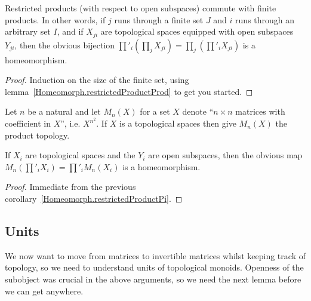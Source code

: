 \begin{corollary}
  \label{Homeomorph.restrictedProductPi}
  \leanok
  Restricted products (with respect to open subspaces) commute with finite products.
  In other words, if $j$ runs through a finite set $J$ and $i$ runs through an arbitrary
  set $I$, and if $X_{ji}$ are topological spaces equipped with open subspaces $Y_{ji}$,
  then the obvious bijection $\prod'_i(\prod_j X_{ji})=\prod_j\left(\prod'_i X_{ji}\right)$
  is a homeomorphism.
\end{corollary}
\begin{proof}
  \leanok
  Induction on the size of the finite set, using lemma~\ref{Homeomorph.restrictedProductProd}
  to get you started.
\end{proof}

 Let $n$ be a natural and let $M_n(X)$ for a set $X$ denote ``$n\times n$
  matrices with coefficient in $X$'', i.e. $X^{n^2}$. If $X$ is a topological
  spaces then give $M_n(X)$ the product topology.

\begin{corollary}
  \label{Homeomorph.restrictedProductMatrix}
  \leanok
  If $X_i$ are topological spaces and the $Y_i$ are open subspaces,
  then the obvious map $M_n(\prod'_iX_i)=\prod'_iM_n(X_i)$ is a homeomorphism.
\end{corollary}
\begin{proof}
  \leanok
  Immediate from the previous corollary~\ref{Homeomorph.restrictedProductPi}.
\end{proof}

\subsection{Units}

We now want to move from matrices to invertible matrices whilst keeping track of topology,
so we need to understand units of topological monoids. Openness of the subobject was
crucial in the above arguments, so we need the next lemma before we can get anywhere.

